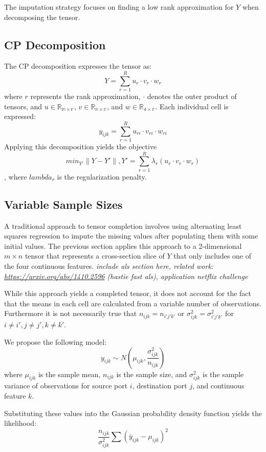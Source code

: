 \documentclass[12pt,twoside]{dukestatscithesis}
\theoremstyle{definition}
\theoremstyle{definition}
\theoremstyle{definition}
\theoremstyle{remark}
\begin{document}
The imputation strategy focuses on finding a low rank approximation for
\(Y\) when decomposing the tensor.

\subsection{CP Decomposition}\label{cp-decomposition}

The CP decomposition expresses the tensor as:
\[Y = \sum_{r=1}^Ru_r \cdotp v_r \cdotp w_r\] where \(r\) represents the
rank approximation, \(\cdotp\) denotes the outer product of tensors, and
\(u \in \mathbb{R_{m \times r}}\), \(v \in \mathbb{R_{n \times r}}\),
and \(w \in \mathbb{R_{4 \times r}}\). Each individual cell is
expressed: \[y_{ijk} = \sum_{r=1}^Ru_{ri} \cdotp v_{ri} \cdotp w_{ri}\]
Applying this decomposition yields the objective
\[min_{Y'}\|Y-Y'\|, Y' = \sum_{r=1}^R\lambda_r(u_r \cdotp v_r \cdotp w_r)\],
where \(lambda_r\) is the regularization penalty.

\subsection{Variable Sample Sizes}\label{variable-sample-sizes}

A traditional approach to tensor completion involves using alternating
least squares regression to impute the missing values after populating
them with some initial values. The previous section applies this
approach to a 2-dimensional \(m \times n\) tensor that represents a
cross-section slice of \(Y\) that only includes one of the four
continuous features. \emph{include als section here, related work:
\url{https://arxiv.org/abs/1410.2596} (hastie fast als), application
netflix challenge}

While this approach yields a completed tensor, it does not account for
the fact that the means in each cell are calculated from a variable
number of observations. Furthermore it is not necessarily true that
\(n_{ijk} = n_{i'j'k'}\) or \(\sigma^2_{ijk} = \sigma^2_{i'j'k'}\) for
\(i \neq i', j \neq j', k \neq k'\).

We propose the following model:
\[y_{ijk} \sim N(\mu_{ijk}, \frac{\sigma^2_{ijk}}{n_{ijk}})\] where
\(\mu_{ijk}\) is the sample mean, \(n_{ijk}\) is the sample size, and
\(\sigma^2_{ijk}\) is the sample variance of observations for source
port \(i\), destination port \(j\), and continuous feature \(k\).

Substituting these values into the Gaussian probability density function
yields the likelihood:
\[\frac{n_{ijk}}{\sigma^2_{ijk}}\sum(\bar y_{ijk} - \mu_{ijk})^2\]
\end{document}
